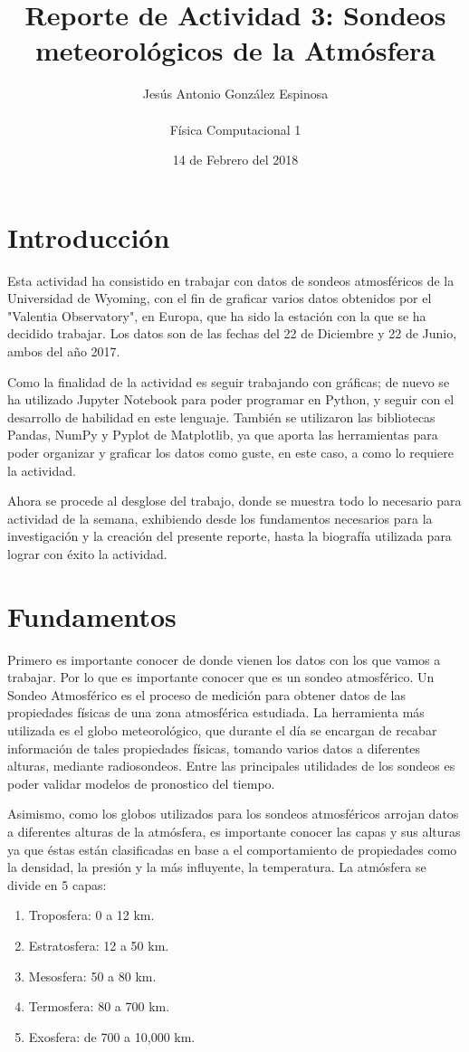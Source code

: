 \documentclass[a4paper]{article}
\title{Reporte de Actividad 3: Sondeos meteorológicos de la Atmósfera}
\author{Jesús Antonio González Espinosa \\ \\ Física Computacional 1}
\date{14 de Febrero del 2018}
\begin{document}
\maketitle

\section{Introducción}
Esta actividad ha consistido en trabajar con datos de sondeos atmosféricos de la Universidad de Wyoming, con el fin de graficar varios datos obtenidos por el "Valentia Observatory", en Europa, que ha sido la estación con la que se ha decidido trabajar. Los datos son de las fechas del 22 de Diciembre y 22 de Junio, ambos del año 2017.

Como la finalidad de la actividad es seguir trabajando con gráficas; de nuevo se ha utilizado Jupyter Notebook para poder programar en Python, y seguir con el desarrollo de habilidad en este lenguaje. También se utilizaron las bibliotecas Pandas, NumPy y Pyplot de Matplotlib, ya que aporta las herramientas para poder organizar y graficar los datos como guste, en este caso, a como lo requiere la actividad. 

Ahora se procede al desglose del trabajo, donde se muestra todo lo necesario para actividad de la semana, exhibiendo desde los fundamentos necesarios para la investigación y la creación del presente reporte, hasta la biografía utilizada para lograr con éxito la actividad. 

\section{Fundamentos}
Primero es importante conocer de donde vienen los datos con los que vamos a trabajar. Por lo que es importante conocer que es un sondeo atmosférico.
Un Sondeo Atmosférico es el proceso de medición para obtener datos de las propiedades físicas de una zona atmosférica estudiada. La herramienta más utilizada es el globo meteorológico, que durante el día se encargan de recabar información de tales propiedades físicas, tomando varios datos a diferentes alturas, mediante radiosondeos. Entre las principales utilidades de los sondeos es poder validar modelos de pronostico del tiempo. 

Asimismo, como los globos utilizados para los sondeos atmosféricos arrojan datos a diferentes alturas de la atmósfera, es importante conocer las capas y sus alturas ya que éstas están clasificadas en base a el comportamiento de propiedades como la densidad, la presión y la más influyente, la temperatura. La atmósfera se divide en 5 capas:
\begin{enumerate}
\item Troposfera: 0 a 12 km.
\item Estratosfera: 12 a 50 km.
\item Mesosfera: 50 a 80 km.
\item Termosfera: 80 a 700 km.
\item Exosfera: de 700 a 10,000 km.
\end{enumerate}
\end{document}
